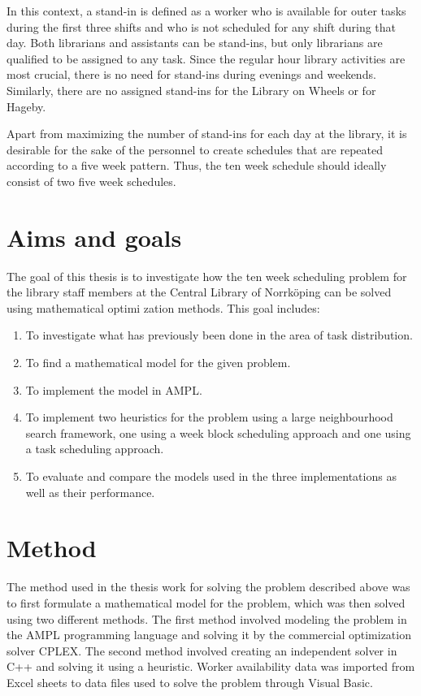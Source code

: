 In this context, a stand-in is defined as a worker who is available for outer tasks during the first three shifts and who is not scheduled for any shift during that day. Both librarians and assistants can be stand-ins, but only librarians are qualified to be assigned to any task. Since the regular hour library activities are most crucial, there is no need for stand-ins during evenings and weekends. Similarly, there are no assigned stand-ins for the Library on Wheels or for Hageby.

Apart from maximizing the number of stand-ins for each day at the library, it is desirable for the sake of the personnel to create schedules that are repeated according to a five week pattern. Thus, the ten week schedule should ideally consist of two five week schedules.

\section{Aims and goals}

The goal of this thesis is to investigate how the ten week scheduling problem for the library staff members at the Central Library of Norrköping can be solved using mathematical optimi zation methods. This goal includes:

\begin{enumerate}
\item To investigate what has previously been done in the area of task distribution.
\item To find a mathematical model for the given problem.
\item To implement the model in AMPL.
\item To implement two heuristics for the problem using a large neighbourhood search framework, one using a week block scheduling approach and one using a task scheduling approach.
\item To evaluate and compare the models used in the three implementations as well as their performance.
\end{enumerate}


\section{Method}
The method used in the thesis work for solving the problem described above was to first formulate a mathematical model for the problem, which was then solved using two different methods. The first method involved modeling the problem in the AMPL programming language and solving it by the commercial optimization solver CPLEX. The second method involved creating an independent solver in C++ and solving it using a heuristic. Worker availability data was imported from Excel sheets to data files used to solve the problem through Visual Basic.

